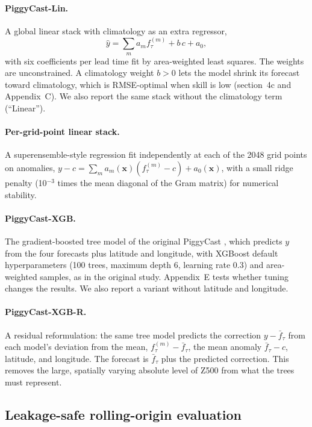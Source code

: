 \documentclass[twocol]{ametsocV6.1}
\newcommand{\Zfive}{Z500}
\newcommand{\PCLin}{PiggyCast-Lin}
\newcommand{\PCXGB}{PiggyCast-XGB}
\newcommand{\PCXGBR}{PiggyCast-XGB-R}
\begin{document}
\paragraph{\PCLin.} A global linear stack with climatology as an extra regressor,
\begin{equation}
\hat{y} = \textstyle\sum_{m} a_m f^{(m)}_\tau + b\, c + a_0, \label{e:lin}
\end{equation}
with six coefficients per lead time fit by area-weighted least squares. The weights are unconstrained. A climatology weight $b>0$ lets the model shrink its forecast toward climatology, which is RMSE-optimal when skill is low (section~4c and Appendix~C). We also report the same stack without the climatology term (``Linear'').

\paragraph{Per-grid-point linear stack.} A superensemble-style regression \citep{krishnamurti1999superensemble} fit independently at each of the 2048 grid points on anomalies, $y-c = \sum_m a_m(\mathbf{x})(f^{(m)}_\tau-c)+a_0(\mathbf{x})$, with a small ridge penalty (10$^{-3}$ times the mean diagonal of the Gram matrix) for numerical stability.

\paragraph{\PCXGB.} The gradient-boosted tree model of the original PiggyCast \citep{chen2016xgboost}, which predicts $y$ from the four forecasts plus latitude and longitude, with XGBoost default hyperparameters (100 trees, maximum depth 6, learning rate 0.3) and area-weighted samples, as in the original study. Appendix~E tests whether tuning changes the results. We also report a variant without latitude and longitude.

\paragraph{\PCXGBR.} A residual reformulation: the same tree model predicts the correction $y-\bar{f}_\tau$ from each model's deviation from the mean, $f^{(m)}_\tau-\bar{f}_\tau$, the mean anomaly $\bar{f}_\tau-c$, latitude, and longitude. The forecast is $\bar{f}_\tau$ plus the predicted correction. This removes the large, spatially varying absolute level of \Zfive{} from what the trees must represent.

\subsection{Leakage-safe rolling-origin evaluation}
\end{document}
